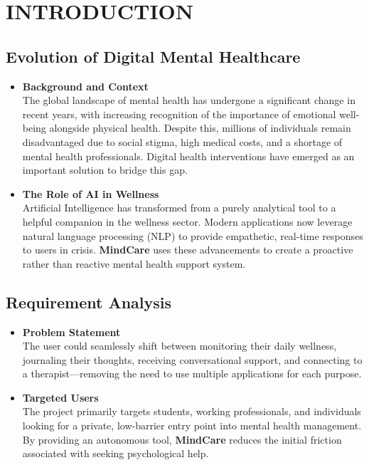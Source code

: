 \documentclass[a4paper,12pt]{report}
\begin{document}
\chapter{INTRODUCTION}
\section{Evolution of Digital Mental Healthcare}
\begin{itemize}
    \item \textbf{Background and Context}\\
    The global landscape of mental health has undergone a significant change in recent years, with increasing recognition of the importance of emotional well-being alongside physical health. Despite this, millions of individuals remain disadvantaged due to social stigma, high medical costs, and a shortage of mental health professionals. Digital health interventions have emerged as an important solution to bridge this gap.
    
    \item \textbf{The Role of AI in Wellness}\\
    Artificial Intelligence has transformed from a purely analytical tool to a helpful companion in the wellness sector. Modern applications now leverage natural language processing (NLP) to provide empathetic, real-time responses to users in crisis. \textbf{MindCare} uses these advancements to create a proactive rather than reactive mental health support system.
\end{itemize}

\section{Requirement Analysis}
\begin{itemize}
    \item \textbf{Problem Statement}\\
    The user could seamlessly shift between monitoring their daily wellness, journaling their thoughts, receiving conversational support, and connecting to a therapist---removing the need to use multiple applications for each purpose.
    
    \item \textbf{Targeted Users}\\
    The project primarily targets students, working professionals, and individuals looking for a private, low-barrier entry point into mental health management. By providing an autonomous tool, \textbf{MindCare} reduces the initial friction associated with seeking psychological help.
\end{itemize}
\end{document}
